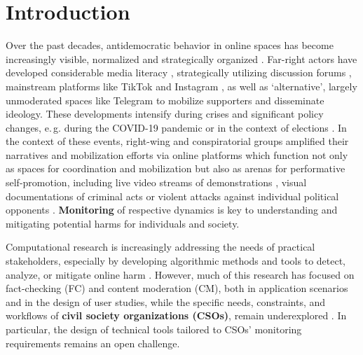 \documentclass[acmsmall]{acmart}
\begin{document}
\maketitle

\section{Introduction}
Over the past decades, antidemocratic behavior in online spaces has become increasingly visible, normalized and strategically organized \cite{eu_parliament_2024,adl_hate_report_2023}. Far-right actors have developed considerable media literacy \cite{conway_right-wing_2019}, strategically utilizing discussion forums \cite{aakerlund_2021_influence}, mainstream platforms like TikTok \cite{widholm_etal_2024,classen_2024_afd} and Instagram \cite{mellea_2024_activeclubs,beauduin_2025_socialmedia}, as well as `alternative', largely unmoderated spaces like Telegram \cite{rothut_etal_2024,guhl_etal_2020,schulze_2020} to mobilize supporters and disseminate ideology. These developments intensify during crises and significant policy changes, e.\,g. during the COVID-19 pandemic or in the context of elections \cite{isd_afd_2024}. In the context of these events, right-wing and conspiratorial groups amplified their narratives and mobilization efforts via online platforms \cite{darius_2022_hashjacking,buehling_heft_2023,bbc_2024_farmersprotest} which function not only as spaces for coordination and mobilization but also as arenas for performative self-promotion, including live video streams of demonstrations \cite{democ_interferenzen_2023}, visual documentations of criminal acts \cite{karimi_cnn_2021} or violent attacks against individual political opponents \cite{tagesspiegelGewaltErpressung}.
\textbf{Monitoring} of respective dynamics is key to understanding and mitigating potential harms for individuals and society.

Computational research is increasingly addressing the needs of practical stakeholders, especially by developing algorithmic methods and tools to detect, analyze, or mitigate online harm \cite{fortuna_survey_2018,yang_multimodal_2022,guo_survey_2022}. However, much of this research has focused on fact-checking (FC) and content moderation (CM), both in application scenarios and in the design of user studies, while the specific needs, constraints, and workflows of \textbf{civil society organizations (CSOs)}, remain underexplored \cite{baumler_harnessing_2025}.  In particular, the design of technical tools tailored to CSOs' monitoring requirements remains an open challenge.
\end{document}

